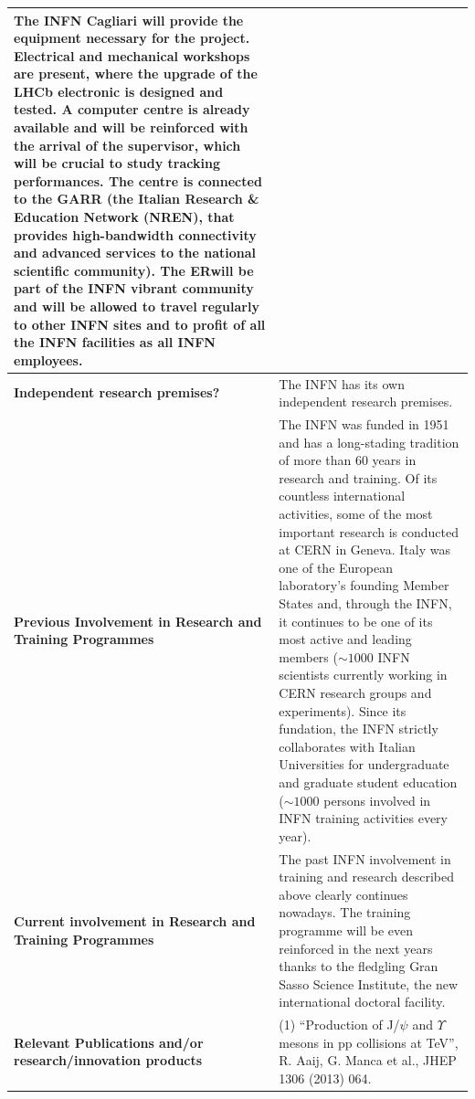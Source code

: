 \documentclass[a4paper,11pt]{article}
\newcommand{\ER}{ER}
\begin{document}
{\begin{tabular}{>{\raggedright}p{}p{}}
The INFN Cagliari will provide the equipment necessary for the 
project. 
Electrical and mechanical workshops are present, where 
the upgrade of the LHCb electronic is designed and tested.
A computer centre is already available and 
will be reinforced with the arrival of the supervisor,
which will be crucial to study tracking performances.
The centre is connected  to
the GARR (the Italian Research \& Education Network (NREN), that
provides high-bandwidth connectivity and advanced services to the
national scientific community).
The \ER will be part of the INFN vibrant community and 
will be allowed to travel regularly to other INFN sites and 
to profit of all the INFN facilities as all INFN 
employees.
\\\midrule
\textbf{Independent research premises?} & The INFN has its own independent research premises.
\\\midrule
\textbf{Previous Involvement in Research and Training Programmes} &
The INFN was funded in 1951 and has a long-stading tradition of
more than 60 years in research and training. Of its countless
international activities, some of the most important research is
conducted at CERN in Geneva. Italy was one of the European
laboratory’s founding Member States and, through the INFN, it
continues to be one of its most active and leading members ($\sim 1000$
INFN scientists currently working in CERN research groups and
experiments). Since its fundation, the INFN strictly collaborates with
Italian Universities for undergraduate and graduate student education
($\sim 1000$ persons involved in INFN training activities every year).
\\\midrule
\textbf{Current involvement in Research and Training Programmes} &
The past INFN involvement in training and research described above
clearly continues nowadays. The training programme will be even
reinforced in the next years thanks to the fledgling Gran Sasso
Science Institute, the new international doctoral facility.
\\\midrule
\textbf{Relevant Publications and/or research/innovation products} &
(1) “Production of J/$\psi$ and $\Upsilon$ mesons in pp collisions at \sqrtsnn=8 TeV”, R. Aaij, G. Manca et al., JHEP 1306 (2013) 064.


\end{tabular}}
\end{document}
